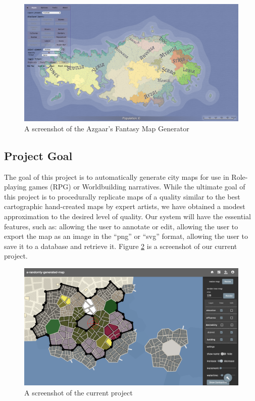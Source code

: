 \begin{figure}[!htb]
\centering
\includegraphics[width=\textwidth]{section01/assets/screenshot_FMG.png}
\caption[A screenshot of the Azgaar's Fantasy Map Generator]{\label{Screenshot FMG}A screenshot of the Azgaar's Fantasy Map Generator}
\end{figure}

\subsection{Project Goal}
The goal of this project is to automatically generate city maps for use in Role-playing games (RPG) or Worldbuilding narratives. While the ultimate goal of this project is to procedurally replicate maps of a quality similar to the best cartographic hand-created maps by expert artists, we have obtained a modest approximation to the desired level of quality. Our system will have the essential features, such as: allowing the user to annotate or edit, allowing the user to export the map as an image in the ``png'' or ``svg'' format, allowing the user to save it to a database and retrieve it. Figure \ref{Screenshot Metropolist} is a screenshot of our current project.

\begin{figure}[!htb]
\centering
\includegraphics[width=\textwidth]{section01/assets/screenshot_Metropolist.png}
\caption[A screenshot of the current project]{\label{Screenshot Metropolist}A screenshot of the current project}
\end{figure}
